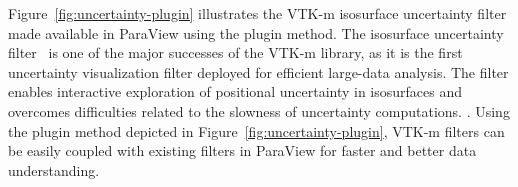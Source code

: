 Figure~\ref{fig:uncertainty-plugin} illustrates the VTK-m isosurface uncertainty filter made available in ParaView using the plugin method. The isosurface uncertainty filter~\cite{Wang2023} is one of the major successes of the VTK-m library, as it is the first uncertainty visualization filter deployed for efficient large-data analysis. The filter enables interactive exploration of positional uncertainty in isosurfaces and overcomes difficulties related to the slowness of uncertainty computations. . Using the plugin method depicted in Figure~\ref{fig:uncertainty-plugin}, VTK-m filters can be easily coupled with existing filters in ParaView for faster and better data understanding.

